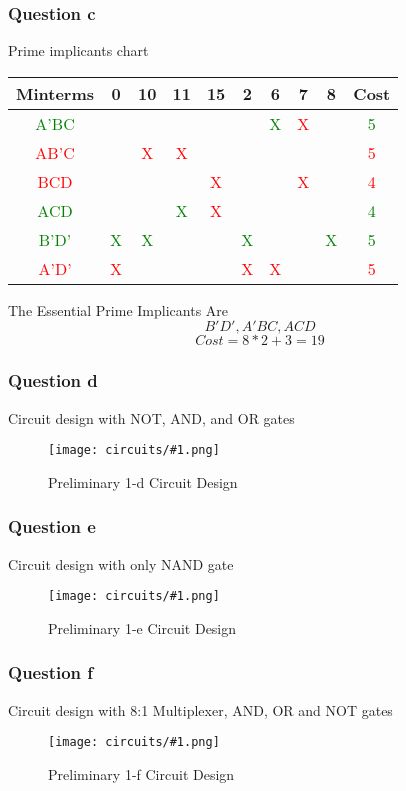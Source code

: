 \documentclass[pdftex,12pt,a4paper]{article}
\newcommand{\qg}[1]{\textcolor{green}{#1}}
\newcommand{\qr}[1]{\textcolor{red}{#1}}
\newcommand{\circuit}[1]{
\begin{figure}[H]
\texttt{[image: circuits/\#1.png]}
\caption{Preliminary #1 Circuit Design}
\end{figure}
}
\begin{document}
\subsubsection{Question c}
Prime implicants chart\par\vspace{15pt}
\begin{center}
\begin{tabular}{c | c c c c c c c c | c}
Minterms & 0 & 10 & 11 & 15 & 2 & 6 & 7 & 8 & Cost\\
\hline 
\qg{A'BC}   &&&&&&\qg{X}&\qr{X}&&\qg{5} \\
\qr{AB'C}   &&\qr{X}&\qr{X}&&&&&&\qr{5} \\
\qr{BCD}    &&&&\qr{X}&&&\qr{X}&&\qr{4} \\
\qg{ACD}    &&&\qg{X}&\qr{X}&&&&&\qg{4} \\
\qg{B'D'}   &\qg{X}&\qg{X}&&&\qg{X}&&&\qg{X}&\qg{5} \\ 
\qr{A'D'}   &\qr{X}&&&&\qr{X}&\qr{X}&&&\qr{5} \\
\end{tabular}
\end{center}
\hspace{20pt}The Essential Prime Implicants Are\[B'D', A'BC, ACD\]
\[Cost = 8 * 2 + 3 = 19\]
\newpage
\subsubsection{Question d}
Circuit design with  NOT, AND, and OR gates\par\vspace{15pt}
\circuit{1-d}
\newpage
\subsubsection{Question e}
Circuit design with only NAND gate\par\vspace{15pt}
\circuit{1-e}
\newpage
\subsubsection{Question f}
Circuit design with 8:1 Multiplexer, AND, OR and NOT gates\par\vspace{15pt}
\circuit{1-f}
\newpage
\end{document}

